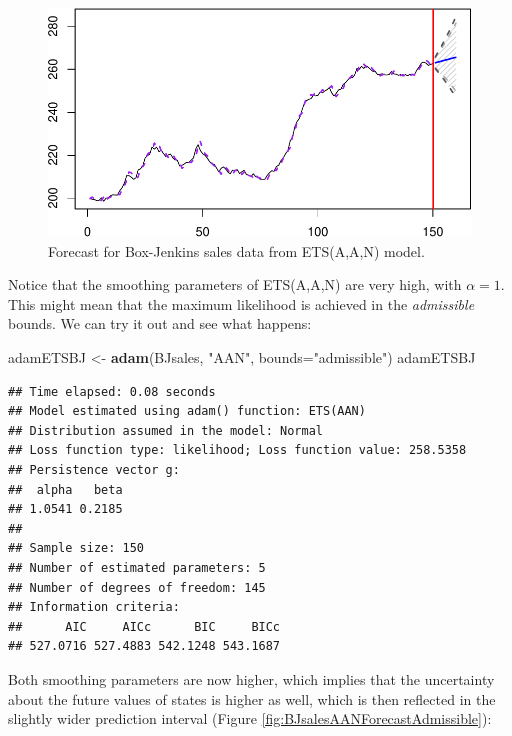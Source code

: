 \documentclass[]{book}
\newenvironment{Shaded}{\begin{snugshade}}{\end{snugshade}}
\newcommand{\DataTypeTok}[1]{\textcolor[rgb]{0.13,0.29,0.53}{#1}}
\newcommand{\KeywordTok}[1]{\textcolor[rgb]{0.13,0.29,0.53}{\textbf{#1}}}
\newcommand{\NormalTok}[1]{#1}
\newcommand{\StringTok}[1]{\textcolor[rgb]{0.31,0.60,0.02}{#1}}
\theoremstyle{definition}
\theoremstyle{definition}
\theoremstyle{definition}
\theoremstyle{definition}
\theoremstyle{remark}
\begin{document}
\begin{figure}
\centering
\includegraphics{Svetunkov--2022----ADAM_files/figure-latex/BJsalesAANForecast-1.pdf}
\caption{\label{fig:BJsalesAANForecast}Forecast for Box-Jenkins sales data from ETS(A,A,N) model.}
\end{figure}

Notice that the smoothing parameters of ETS(A,A,N) are very high, with \(\alpha=1\). This might mean that the maximum likelihood is achieved in the \emph{admissible} bounds. We can try it out and see what happens:

\begin{Shaded}
\begin{Highlighting}[]
\NormalTok{adamETSBJ <-}\StringTok{ }\KeywordTok{adam}\NormalTok{(BJsales, }\StringTok{"AAN"}\NormalTok{, }\DataTypeTok{bounds=}\StringTok{"admissible"}\NormalTok{)}
\NormalTok{adamETSBJ}
\end{Highlighting}
\end{Shaded}

\begin{verbatim}
## Time elapsed: 0.08 seconds
## Model estimated using adam() function: ETS(AAN)
## Distribution assumed in the model: Normal
## Loss function type: likelihood; Loss function value: 258.5358
## Persistence vector g:
##  alpha   beta 
## 1.0541 0.2185 
## 
## Sample size: 150
## Number of estimated parameters: 5
## Number of degrees of freedom: 145
## Information criteria:
##      AIC     AICc      BIC     BICc 
## 527.0716 527.4883 542.1248 543.1687
\end{verbatim}

Both smoothing parameters are now higher, which implies that the uncertainty about the future values of states is higher as well, which is then reflected in the slightly wider prediction interval (Figure \ref{fig:BJsalesAANForecastAdmissible}):
\end{document}
